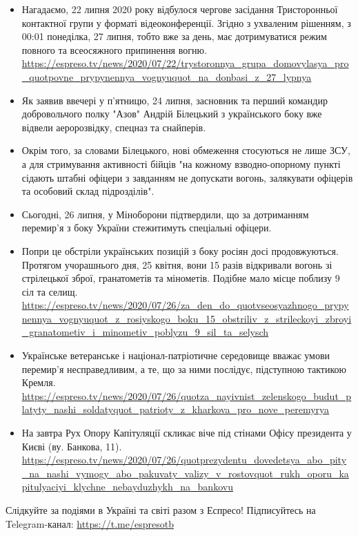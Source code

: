 \begin{itemize}
		\item Нагадаємо, 22 липня 2020 року відбулося чергове засідання Тристоронньої
		контактної групи у форматі відеоконференції. Згідно з ухваленим рішенням, з
		00:01 понеділка, 27 липня, тобто вже за день, має дотримуватися режим
		повного та всеосяжного припинення вогню.
								\url{https://espreso.tv/news/2020/07/22/trystoronnya_grupa_domovylasya_pro_quotpovne_prypynennya_vognyuquot_na_donbasi_z_27_lypnya}

		\item Як заявив ввечері у п'ятницю, 24 липня, засновник та перший командир
		добровольчого полку "Азов" Андрій Білецький з українського боку вже відвели
		аеророзвідку, спецназ та снайперів.

		\item Окрім того, за словами Білецького, нові обмеження стосуються не лише ЗСУ, а
		для стримування активності бійців "на кожному взводно-опорному пункті
		сідають штабні офіцери з завданням не допускати вогонь, залякувати офіцерів
		та особовий склад підрозділів".

		\item Сьогодні, 26 липня, у Міноборони підтвердили, що за дотриманням перемир'я з
		боку України стежитимуть спеціальні офіцери.

		\item Попри це обстріли українських позицій з боку росіян досі продовжуються.
		Протягом учорашнього дня, 25 квітня, вони 15 разів відкривали вогонь зі
		стрілецької зброї, гранатометів та мінометів. Подібне мало місце поблизу 9
		сіл та селищ.
								\url{https://espreso.tv/news/2020/07/26/za_den_do_quotvseosyazhnogo_prypynennya_vognyuquot_z_rosiyskogo_boku_15_obstriliv_z_strileckoyi_zbroyi_granatometiv_i_minometiv_poblyzu_9_sil_ta_selysch}

		\item Українське ветеранське і націонал-патріотичне середовище вважає умови
		перемир'я несправедливим, а те, що за ними послідує, підступною тактикою
		Кремля.
		\url{https://espreso.tv/news/2020/07/26/quotza_nayivnist_zelenskogo_budut_platyty_nashi_soldatyquot_patrioty_z_kharkova_pro_nove_peremyrya}

		\item На завтра Рух Опору Капітуляції скликає віче під стінами Офісу президента у
		Києві (ву. Банкова, 11).
								\url{https://espreso.tv/news/2020/07/26/quotprezydentu_dovedetsya_abo_pity_na_nashi_vymogy_abo_pakuvaty_valizy_v_rostovquot_rukh_oporu_kapitulyaciyi_klychne_nebayduzhykh_na_bankovu}
\end{itemize}

Слідкуйте за подіями в Україні та світі разом з Еспресо! Підписуйтесь на
Telegram-канал: \url{https://t.me/espresotb}
